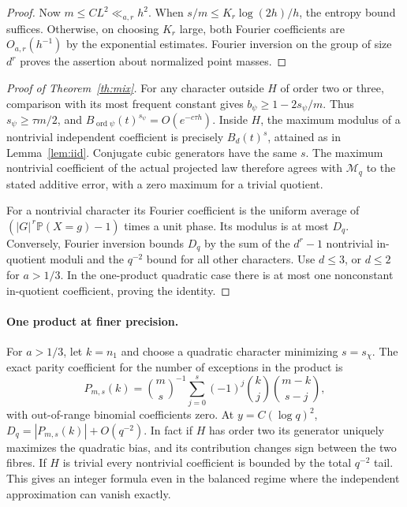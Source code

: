 \documentclass[11pt,letterpaper]{article}
\newcommand{\pr}{\mathbb P}
\newcommand{\abs}[1]{\lvert#1\rvert}
\begin{document}
\begin{proof}
Now \(m\le C L^2\ll_{a,r} h^2\). When \(s/m\le K_r\log(2h)/h\), the entropy bound suffices. Otherwise, on choosing \(K_r\) large, both Fourier coefficients are \(O_{a,r}(h^{-1})\) by the exponential estimates. Fourier inversion on the group of size \(d^r\) proves the assertion about normalized point masses.
\end{proof}

\begin{proof}[Proof of Theorem~\ref{th:mix}]
For any character outside \(H\) of order two or three, comparison with its most frequent constant gives \(b_\psi\ge1-2s_\psi/m\). Thus \(s_\psi\ge\tau m/2\), and \(B_{\operatorname{ord}\psi}(t)^{s_\psi}=O(e^{-c\tau h})\). Inside \(H\), the maximum modulus of a nontrivial independent coefficient is precisely \(B_d(t)^s\), attained as in Lemma~\ref{lem:iid}. Conjugate cubic generators have the same \(s\). The maximum nontrivial coefficient of the actual projected law therefore agrees with \(\mathcal M_q\) to the stated additive error, with a zero maximum for a trivial quotient.

For a nontrivial character its Fourier coefficient is the uniform average of \((\abs{G}^{\,r}\pr(X=g)-1)\) times a unit phase. Its modulus is at most \(D_q\). Conversely, Fourier inversion bounds \(D_q\) by the sum of the \(d^r-1\) nontrivial in-quotient moduli and the \(q^{-2}\) bound for all other characters. Use \(d\le3\), or \(d\le2\) for \(a>1/3\). In the one-product quadratic case there is at most one nonconstant in-quotient coefficient, proving the identity.
\end{proof}

\paragraph{One product at finer precision.}
For \(a>1/3\), let \(k=n_1\) and choose a quadratic character minimizing \(s=s_\chi\). The exact parity coefficient for the number of exceptions in the product is
\[
 P_{m,s}(k)=\binom{m}{s}^{-1}\sum_{j=0}^s(-1)^j
                 \binom{k}{j}\binom{m-k}{s-j},
\]
with out-of-range binomial coefficients zero. At \(y=C(\log q)^2\),
\(D_q=|P_{m,s}(k)|+O(q^{-2})\). In fact if \(H\) has order two its generator uniquely maximizes the quadratic bias, and its contribution changes sign between the two fibres. If \(H\) is trivial every nontrivial coefficient is bounded by the total \(q^{-2}\) tail. This gives an integer formula even in the balanced regime where the independent approximation can vanish exactly.
\end{document}
